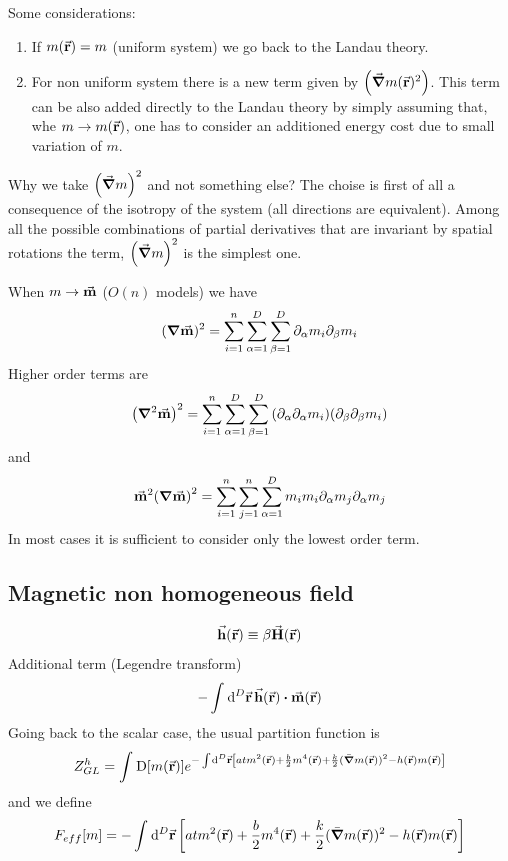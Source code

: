 \documentclass[../main/main.tex]{subfiles}
\begin{document}
Some considerations:
\begin{enumerate}
\item If \( m(\va{r}) = m \) (uniform system) we go back to the Landau theory.
\item For non uniform system there is a new term given by \( \qty(\va{\grad } m (\va{r})^2 ) \). This term can be also added directly to the Landau theory by simply assuming that, whe \( m \rightarrow m(\va{r}) \), one has to consider an additioned energy cost due to small variation of \( m \).
\end{enumerate}
Why we take \( \qty(\va{\grad }m)^2  \) and not something else?
The choise is first of all a consequence of the isotropy of the system (all directions are equivalent).
Among all the possible combinations of partial derivatives that are invariant by spatial rotations the term, \( \qty(\va{\grad }m)^2  \) is the simplest one.
\begin{remark}
When \( m \rightarrow \va{m} \) (\( O(n) \) models) we have
\begin{equation}
  (\grad \va{m})^2 = \sum_{i=1}^{n} \sum_{\alpha =1}^{D} \sum_{\beta =1}^{D} \partial_ \alpha {m_i} \partial_ \beta  {m_i}
\end{equation}
Higher order terms are
\begin{equation}
  \qty(\grad ^2 \va{m})^2 =  \sum_{i=1}^{n} \sum_{\alpha =1}^{D} \sum_{\beta =1}^{D}
  \qty(\partial_ \alpha \partial_ \alpha {m_i}) \qty( \partial_ \beta \partial_ \beta {m_i})
\end{equation}
and
\begin{equation}
  \va{m}^2 \qty(\grad  \va{m})^2 =  \sum_{i=1}^{n} \sum_{j=1}^{n} \sum_{\alpha  =1}^{D} m_i m_i \partial_ \alpha {m_j} \partial_ \alpha {m_j}
\end{equation}
In most cases it is sufficient to consider only the lowest order term.
\end{remark}
\subsection{Magnetic non homogeneous field}
\begin{equation}
  \va{h} ( \va{r}) \equiv \beta \va{H} ( \va{r})
\end{equation}
Additional term (Legendre transform)
\begin{equation}
  - \int_{}^{} \dd[D]{\va{r}} \va{h} (\va{r}) \vdot \va{m} (\va{r})
\end{equation}
Going back to the scalar case, the usual partition function is
\begin{equation}
  Z_{GL}^h = \int_{}^{} \text{D} [m(\va{r})] e^{  -\int_{}^{} \dd[D]{\va{r}} \qty[a t m^2 (\va{r}) + \frac{b}{2} m^4 (\va{r}) + \frac{k}{2} (\bar{\grad } m (\va{r}))^2 - h(\va{r})m(\va{r}) ]  }
\end{equation}
and we define
\begin{equation}
  F_{eff}[m] = -\int_{}^{} \dd[D]{\va{r}} \qty[a t m^2 (\va{r}) + \frac{b}{2} m^4 (\va{r}) + \frac{k}{2} (\bar{\grad } m (\va{r}))^2 - h(\va{r})m(\va{r})]
\end{equation}
\end{document}
